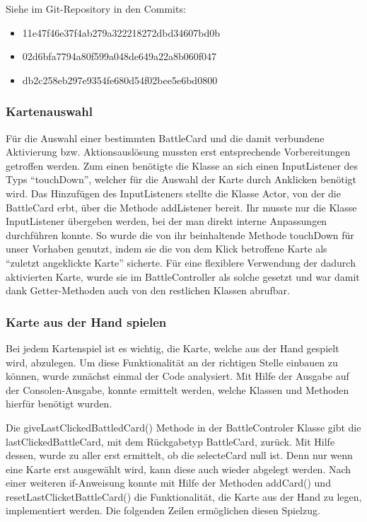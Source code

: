 Siehe im Git-Repository in den Commits:
\begin{itemize}
\item 11e47f46e37f4ab279a322218272dbd34607bd0b
\item 02d6bfa7794a80f599a048de649a22a8b060f047
\item db2c258eb297e9354fe680d54f02bee5e6bd0800
\end{itemize}

\subsubsection{Kartenauswahl}
Für die Auswahl einer bestimmten BattleCard und die damit verbundene Aktivierung bzw. Aktionsauslösung mussten erst entsprechende Vorbereitungen getroffen werden.
Zum einen benötigte die Klasse an sich einen InputListener des Typs “touchDown”, welcher für die Auswahl der Karte durch Anklicken benötigt wird. Das Hinzufügen des InputListeners stellte die Klasse Actor, von der die BattleCard erbt, über die Methode addListener bereit. Ihr musste nur die Klasse InputListener übergeben werden, bei der man direkt interne Anpassungen durchführen konnte. So wurde die von ihr beinhaltende Methode touchDown für unser Vorhaben genutzt, indem sie die von dem Klick betroffene Karte als “zuletzt angeklickte Karte” sicherte. Für eine flexiblere Verwendung der dadurch aktivierten Karte, wurde sie im BattleController als solche gesetzt und war damit dank Getter-Methoden auch von den restlichen Klassen abrufbar.

\subsubsection{Karte aus der Hand spielen}
Bei jedem Kartenspiel ist es wichtig, die Karte, welche aus der Hand gespielt wird, abzulegen. Um diese Funktionalität an der richtigen Stelle einbauen zu können, wurde zunächst einmal der Code analysiert. Mit Hilfe der Ausgabe auf der Consolen-Ausgabe, konnte ermittelt werden, welche Klassen und Methoden hierfür benötigt wurden. 

Die giveLastClickedBattledCard() Methode in der BattleControler Klasse gibt die lastClickedBattleCard, mit dem Rückgabetyp BattleCard, zurück. Mit Hilfe dessen, wurde zu aller erst ermittelt, ob die selecteCard null ist. Denn nur wenn eine Karte erst ausgewählt wird, kann diese auch wieder abgelegt werden. Nach einer weiteren if-Anweisung konnte mit Hilfe der Methoden addCard() und resetLastClicketBattleCard() die Funktionalität, die Karte aus der Hand zu legen, implementiert werden. Die folgenden Zeilen ermöglichen diesen Spielzug. 

